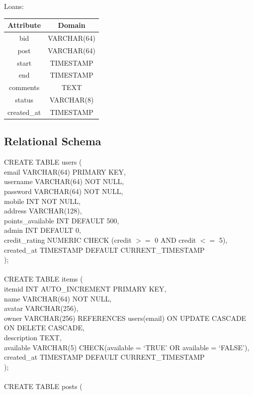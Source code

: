 \begin{center}
Loans: \quad
\begin{tabular}{|c|c|}
\hline
Attribute & Domain\\
\hline
bid & VARCHAR(64)\\
post & VARCHAR(64) \\
start & TIMESTAMP \\
end & TIMESTAMP \\
comments & TEXT \\
status & VARCHAR(8) \\
created\_at & TIMESTAMP \\
\hline
\end{tabular}
\end{center}

\subsection{Relational Schema}
CREATE TABLE users (\\
email VARCHAR(64) PRIMARY KEY,\\
username VARCHAR(64) NOT NULL,\\
password VARCHAR(64) NOT NULL,\\
mobile INT NOT NULL,\\
address VARCHAR(128), \\
points\_available INT DEFAULT 500,\\
admin INT DEFAULT 0,\\
credit\_rating NUMERIC CHECK (credit $>=$ 0 AND credit $<=$ 5),\\
created\_at TIMESTAMP DEFAULT CURRENT\_TIMESTAMP\\
);\\\\
CREATE TABLE items (\\
itemid INT AUTO\_INCREMENT PRIMARY KEY,\\
name VARCHAR(64) NOT NULL,\\
avatar VARCHAR(256),\\
owner VARCHAR(256) REFERENCES users(email) ON UPDATE CASCADE ON DELETE CASCADE,\\
description TEXT,\\
available VARCHAR(5) CHECK(available = `TRUE' OR available = `FALSE'),\\
created\_at TIMESTAMP DEFAULT CURRENT\_TIMESTAMP\\
);\\\\
CREATE TABLE posts (\\
